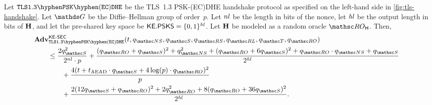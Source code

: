\begin{corollary}\label{cor:full-psk-ecdhe-ke}
	Let $\TLSPSKECDHE$ be the TLS~1.3 PSK-(EC)DHE handshake protocol as specified on the left-hand side in \autoref{fig:tls-handshake}.
	Let $\G$ be the Diffie--Hellman group of order~$p$.
	Let $nl$ be the length in bits of the nonce, let $\mathit{hl}$ be the output length in bits of $\mathbf{H}$, and let the pre-shared key space be $\mathsf{KE}.\mathsf{PSKS} = \{0,1\}^{\mathit{hl}}$.
	Let $\mathbf{H}$ be modeled as a random oracle $\RO_\hash$.
	Then,
{\allowdisplaybreaks
	\begin{align*}
		&\genAdv{\KESEC}{\TLSPSKECDHE}{t, \qNewSecret, \qSend, \qRevSessionKey, \qRevLongTermKey, \qTest, \qRO} \\
		&\qquad\leq \frac{2\qSend^2}{2^{\nl} \cdot p} + \frac{(\qRO+\qSend)^2 + \qNewSecret^2 + (\qRO+6\qSend)^2 + \qRO \cdot \qNewSecret + \qSend}{2^{\hashlen}} \\
		&\qquad\qquad +  \frac{4(t + t_{\mathrm{AEAD}} \cdot \qSend + 4 \log(p) \cdot \qRO)^2}{p}\\
		&\qquad\qquad + \frac{2(12\qSend+\qRO)^2 + 2\qRO^2 + 8(\qRO+36\qSend)^2}{2^{\hashlen}}.
	\end{align*}
}
\end{corollary}

	


